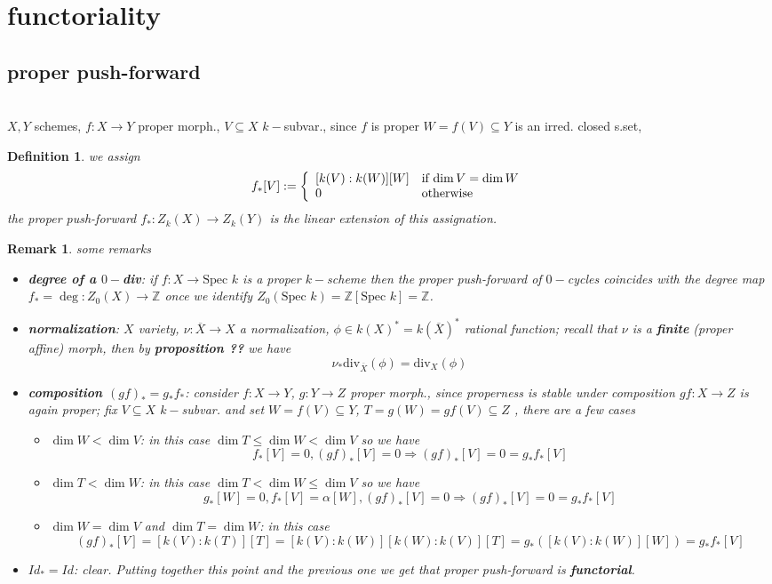 \documentclass[oneside,a4paper,11pt]{amsbook}
\theoremstyle{pl}
\theoremstyle{df}
\newtheorem*{dfn}{Definition}
\theoremstyle{rm}
\newtheorem{rmk}{Remark}[chapter]
\newcommand{\nline}{
~\\
}%
\newcommand{\pa}[1]{
\left(#1\right)
}
\newcommand{\ol}[1]{
\overline{#1}
}
\newcommand{\mb}[1]{
\mathbb{#1}
}
\newcommand{\spc}[1]{
\text{Spec }#1
}
\begin{document}
\section{functoriality}
\subsection{proper push-forward}
\nline
$X,Y$ schemes, $f:X\rightarrow Y$ proper morph., $V\subseteq X$ $k-$subvar., since $f$ is proper $W=f(V)\subseteq Y$ is an irred. closed s.set, 

\begin{dfn}
 we assign
 \[
f_*[V]:=\left\{
\begin{array}{l l}
[k(V):k(W)][W] &\text{if $\dim V=\dim W$}\\
0 &\text{otherwise}\\
\end{array}
\right.
\]
the proper push-forward $f_*:Z_k(X)\rightarrow Z_k(Y)$ is the linear extension of this assignation.
\end{dfn}

\begin{rmk}
some remarks
\begin{itemize}
\item{\textbf{degree of a $0-$div}: if $f:X\rightarrow\spc k$ is a proper $k-$scheme then the proper push-forward of $0-$cycles coincides with the degree map $f_*=\deg:Z_0(X)\rightarrow\mb{Z}$ once we identify $Z_0(\spc k)=\mb{Z}[\spc k]=\mb{Z}$.}
\item{\textbf{normalization}: $X$ variety, $\nu:\ol{X}\rightarrow X$ a normalization, $\phi\in k(X)^*=k(\ol{X})^*$ rational function; recall that $\nu$ is a \textbf{finite} (proper affine) morph, then by \textbf{proposition ??} we have
\[
\nu_*\text{div}_{\ol{X}}(\phi)=\text{div}_X(\phi)
\]
}
\item{\textbf{composition $(gf)_*=g_*f_*$}: consider $f:X\rightarrow Y$, $g:Y\rightarrow Z$ proper morph., since properness is stable under composition $gf:X\rightarrow Z$ is again proper; fix $V\subseteq X$ $k-$subvar. and set $W=f(V)\subseteq Y$, $T=g(W)=gf(V)\subseteq Z$ , there are a few cases
\begin{itemize}
\item{$\dim W<\dim V$: in this case $\dim T\le\dim W<\dim V$ so we have 
\[
f_*[V]=0,(gf)_*[V]=0\Rightarrow (gf)_*[V]=0=g_*f_*[V]
\]
}
\item{$\dim T<\dim W$: in this case $\dim T<\dim W\le\dim V$ so we have 
\[
g_*[W]=0, f_*[V]=\alpha[W],(gf)_*[V]=0\Rightarrow (gf)_*[V]=0=g_*f_*[V]
\]
}
\item{$\dim W=\dim V$ and $\dim T=\dim W$: in this case
\[
(gf)_*[V]=[k(V):k(T)][T]=[k(V):k(W)][k(W):k(V)][T]=g_*\pa{[k(V):k(W)][W]}=g_*f_*[V]
\]
}
\end{itemize}
}
\item{$Id_*=Id$: clear. Putting together this point and the previous one we get that proper push-forward is \textbf{functorial}.}
\end{itemize}
\end{rmk}
\end{document}

